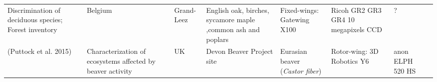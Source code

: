 \documentclass[]{interact}
\theoremstyle{plain}%
\theoremstyle{definition}
\theoremstyle{remark}
\begin{document}
\begin{longtable}[]{@{}llllllll@{}}
\begin{minipage}[t]{0.18\columnwidth}
Discrimination of deciduous species; Forest inventory\strut
\end{minipage} & \begin{minipage}[t]{0.03\columnwidth}\raggedright\strut
Belgium\strut
\end{minipage} & \begin{minipage}[t]{0.14\columnwidth}\raggedright\strut
Grand-Leez\strut
\end{minipage} & \begin{minipage}[t]{0.10\columnwidth}\raggedright\strut
English oak, birches, sycamore maple ,common ash and poplars\strut
\end{minipage} & \begin{minipage}[t]{0.09\columnwidth}\raggedright\strut
Fixed-wings: Gatewing X100\strut
\end{minipage} & \begin{minipage}[t]{0.11\columnwidth}\raggedright\strut
Ricoh GR2 GR3 GR4 10 megapixels CCD\strut
\end{minipage} & \begin{minipage}[t]{0.01\columnwidth}\raggedright\strut
?\strut
\end{minipage}\tabularnewline
\begin{minipage}[t]{0.11\columnwidth}\raggedright\strut
(Puttock et al. 2015)\strut
\end{minipage} & \begin{minipage}[t]{0.18\columnwidth}\raggedright\strut
Characterization of ecosystems affected by beaver activity\strut
\end{minipage} & \begin{minipage}[t]{0.03\columnwidth}\raggedright\strut
UK\strut
\end{minipage} & \begin{minipage}[t]{0.14\columnwidth}\raggedright\strut
Devon Beaver Project site\strut
\end{minipage} & \begin{minipage}[t]{0.10\columnwidth}\raggedright\strut
Eurasian beaver (\emph{Castor fiber})\strut
\end{minipage} & \begin{minipage}[t]{0.09\columnwidth}\raggedright\strut
Rotor-wing: 3D Robotics Y6\strut
\end{minipage} & \begin{minipage}[t]{0.11\columnwidth}\raggedright\strut
anon ELPH 520 HS\strut
\end{minipage} & \begin{minipage}[t]{0.01\columnwidth}\raggedright\strut

\end{minipage}
\end{longtable}
\end{document}
